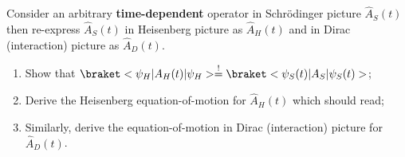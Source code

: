 \begin{problem}
  Consider an arbitrary \textbf{time-dependent} operator in Schr\"odinger picture
  $\hat A_S(t)$ then re-express $\hat A_S(t)$ in Heisenberg picture
  as $\hat A_H(t)$ and in Dirac (interaction) picture as $\hat A_D(t)$.
  \begin{enumerate}
    \item Show that $\braket<\psi_H|A_H(t)|\psi_H> \overset!=
    \braket<\psi_S(t)|A_S|\psi_S(t)>$;
    \item Derive the Heisenberg equation-of-motion for $\hat A_H(t)$
    which should read;
    \item Similarly, derive the equation-of-motion in Dirac (interaction)
    picture for $\hat A_D(t)$.
  \end{enumerate}
\end{problem}
